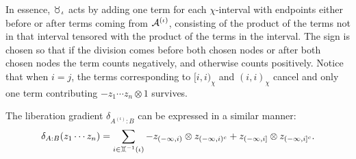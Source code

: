 In essence, $\taur_\iota$ acts by adding one term for each $\chi$-interval with endpoints either before or after terms coming from $\mathcal{A}^{(\iota)}$, consisting of the product of the terms not in that interval tensored with the product of the terms in the interval.
The sign is chosen so that if the division comes before both chosen nodes or after both chosen nodes the term counts negatively, and otherwise counts positively.
Notice that when $i = j$, the terms corresponding to $[i,i)_\chi$ and $(i,i)_\chi$ cancel and only one term contributing $-z_1\cdots z_n \otimes 1$ survives.

The liberation gradient $\delta_{A^{(\iota)}:B}$ can be expressed in a similar manner:
$$\delta_{A:B}(z_1\cdots z_n) = \sum_{i \in \gem^{-1}(\iota)} -z_{(-\infty, i)}\otimes z_{(-\infty, i)^c} + z_{(-\infty, i]} \otimes z_{(-\infty, i]^c}.$$

